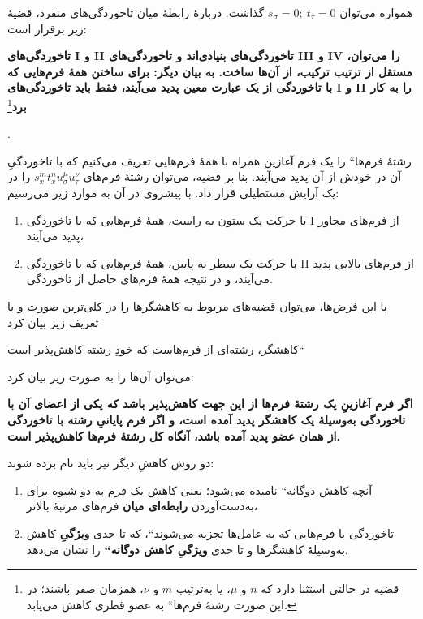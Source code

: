 \documentclass[11pt]{article}
\providecommand{\glqq}{\textquotedblbase}
\providecommand{\grqq}{\textquotedblleft}
\providecommand{\srcspaced}[1]{{\bfseries #1}}
\newcommand{\srcLTR}[1]{\relax\ifmmode\text{\mbox{\babelsublr{\foreignlanguage{english}{#1}}}}\else\babelsublr{\foreignlanguage{english}{#1}}\fi}
\newcommand{\srcfn}[2]{\begingroup\renewcommand{\thefootnote}{\srcLTR{#1}}\footnote{#2}\addtocounter{footnote}{-1}\endgroup}
\begin{document}
همواره می‌توان $s_\sigma=0;\ t_\tau=0$ گذاشت. دربارهٔ رابطهٔ میان تاخوردگی‌های منفرد، قضیهٔ زیر برقرار است:

\srcspaced{تاخوردگی‌های I و II تاخوردگی‌های بنیادی‌اند و تاخوردگی‌های III و IV را می‌توان، مستقل از ترتیب ترکیب، از آن‌ها ساخت. به بیان دیگر: برای ساختن همهٔ فرم‌هایی که با تاخوردگی از یک عبارت معین پدید می‌آیند، فقط باید تاخوردگی‌های I و II را به کار برد}\srcfn{2)}{قضیه در حالتی استثنا دارد که $n$ و $\mu$، یا به‌ترتیب $m$ و $\nu$، همزمان صفر باشند؛ در این صورت \glqq{}رشتهٔ فرم‌ها\grqq{} به عضو قطری کاهش می‌یابد.}.

\glqq{}رشتهٔ فرم‌ها\grqq{} را یک فرم آغازین همراه با همهٔ فرم‌هایی تعریف می‌کنیم که با تاخوردگیِ آن در خودش از آن پدید می‌آیند. بنا بر قضیه، می‌توان رشتهٔ فرم‌های $s_x^m t_x^n u_\sigma^\mu u_\tau^\nu$ را در یک آرایش مستطیلی قرار داد. با پیشروی در آن به موارد زیر می‌رسیم:
\begin{enumerate}
\item با حرکت یک ستون به راست، همهٔ فرم‌هایی که با تاخوردگی I از فرم‌های مجاور پدید می‌آیند،
\item با حرکت یک سطر به پایین، همهٔ فرم‌هایی که با تاخوردگی II از فرم‌های بالایی پدید می‌آیند، و در نتیجه همهٔ فرم‌های حاصل از تاخوردگی.
\end{enumerate}

با این فرض‌ها، می‌توان قضیه‌های مربوط به کاهشگرها را در کلی‌ترین صورت و با تعریف زیر بیان کرد
\begin{center}
\glqq{}کاهشگر، رشته‌ای از فرم‌هاست که خودِ رشته کاهش‌پذیر است\grqq{}
\end{center}
می‌توان آن‌ها را به صورت زیر بیان کرد:

\begin{center}
\srcspaced{اگر فرم آغازینِ یک رشتهٔ فرم‌ها از این جهت کاهش‌پذیر باشد که یکی از اعضای آن با تاخوردگی به‌وسیلهٔ یک کاهشگر پدید آمده است، و اگر فرم پایانیِ رشته با تاخوردگی از همان عضو پدید آمده باشد، آنگاه کل رشتهٔ فرم‌ها کاهش‌پذیر است.}
\end{center}

دو روش کاهشِ دیگر نیز باید نام برده شوند:
\begin{enumerate}
\item آنچه \glqq{}کاهش دوگانه\grqq{} نامیده می‌شود؛ یعنی کاهش یک فرم به دو شیوه برای به‌دست‌آوردن \srcspaced{رابطه‌ای میان} فرم‌های مرتبهٔ بالاتر،
\item \glqq{}تاخوردگی با فرم‌هایی که به عامل‌ها تجزیه می‌شوند\grqq{}، که تا حدی \srcspaced{ویژگیِ} کاهش به‌وسیلهٔ کاهشگرها و تا حدی \srcspaced{ویژگیِ \glqq{}کاهش دوگانه\grqq{}} را نشان می‌دهد.
\end{enumerate}
\clearpage
\setcounter{footnote}{0}
\end{document}

